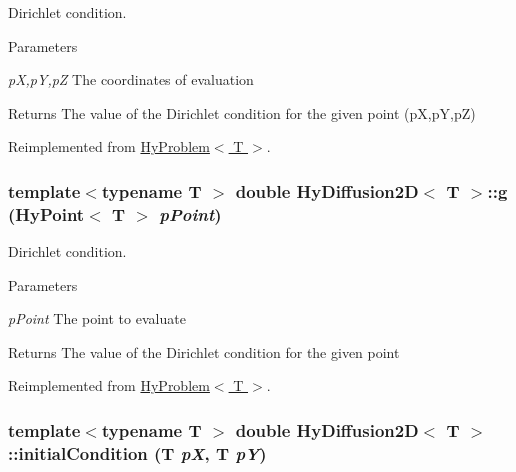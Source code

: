 Dirichlet condition. 


\begin{DoxyParams}{Parameters}
\item[{\em pX,pY,pZ}]The coordinates of evaluation \end{DoxyParams}
\begin{DoxyReturn}{Returns}
The value of the Dirichlet condition for the given point (pX,pY,pZ) 
\end{DoxyReturn}


Reimplemented from \hyperlink{classHyProblem}{HyProblem$<$ T $>$}.

\hypertarget{classHyDiffusion2D_a0df1a7fbe0b6a50d85a74c655f32cfb2}{
\subsubsection[{g}]{\setlength{\rightskip}{0pt plus 5cm}template$<$typename T $>$ double {\bf HyDiffusion2D}$<$ T $>$::g ({\bf HyPoint}$<$ T $>$ {\em pPoint})}}
\label{classHyDiffusion2D_a0df1a7fbe0b6a50d85a74c655f32cfb2}


Dirichlet condition. 


\begin{DoxyParams}{Parameters}
\item[{\em pPoint}]The point to evaluate \end{DoxyParams}
\begin{DoxyReturn}{Returns}
The value of the Dirichlet condition for the given point 
\end{DoxyReturn}


Reimplemented from \hyperlink{classHyProblem_a5d3b78c69811136e74e9fc9232cc110b}{HyProblem$<$ T $>$}.

\hypertarget{classHyDiffusion2D_ae04d50ba468b2338bbf4d134d43ffe49}{
\subsubsection[{initialCondition}]{\setlength{\rightskip}{0pt plus 5cm}template$<$typename T $>$ double {\bf HyDiffusion2D}$<$ T $>$::initialCondition (T {\em pX}, \/  T {\em pY})}}
\label{classHyDiffusion2D_ae04d50ba468b2338bbf4d134d43ffe49}


